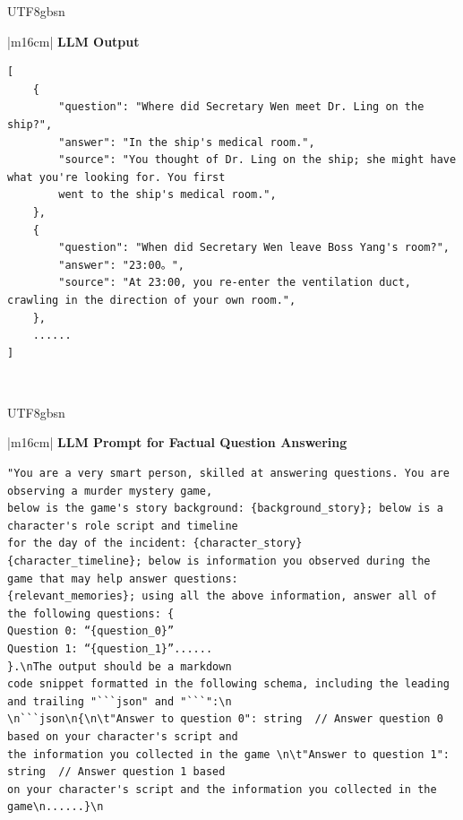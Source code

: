 \documentclass[11pt]{article}
\begin{document}
{\begin{CJK}{UTF8}{gbsn}
\begin{table}[ht!]
\begin{minipage}[t]{\linewidth}
\begin{tabular}{|m{16cm}|}
\hline
{}  \textbf{LLM Output}  \\
\hline
\begin{minipage}[t]{\linewidth}
\small\begin{verbatim}
[
    {
        "question": "Where did Secretary Wen meet Dr. Ling on the ship?",
        "answer": "In the ship's medical room.",
        "source": "You thought of Dr. Ling on the ship; she might have what you're looking for. You first 
        went to the ship's medical room.",
    },
    {
        "question": "When did Secretary Wen leave Boss Yang's room?",
        "answer": "23:00。",
        "source": "At 23:00, you re-enter the ventilation duct, crawling in the direction of your own room.",
    },
    ......
]
\end{verbatim}
\end{minipage} \\
\hline
\end{tabular}
\end{minipage}
\caption{LLM prompts and outputs for factual question generation. (English Translation)}
\end{table}
\end{CJK}






\begin{CJK}{UTF8}{gbsn}
\begin{table}[ht!]
\centering
\begin{minipage}[t]{\linewidth}
\begin{tabular}{|m{16cm}|}
  {\textbf{LLM Prompt for Factual Question Answering}} \\
\begin{minipage}[t]{\linewidth}
\small\begin{verbatim}
"You are a very smart person, skilled at answering questions. You are observing a murder mystery game, 
below is the game's story background: {background_story}; below is a character's role script and timeline 
for the day of the incident: {character_story}
{character_timeline}; below is information you observed during the game that may help answer questions:
{relevant_memories}; using all the above information, answer all of the following questions: {
Question 0: “{question_0}”
Question 1: “{question_1}”......
}.\nThe output should be a markdown
code snippet formatted in the following schema, including the leading and trailing "```json" and "```":\n
\n```json\n{\n\t"Answer to question 0": string  // Answer question 0 based on your character's script and
the information you collected in the game \n\t"Answer to question 1": string  // Answer question 1 based 
on your character's script and the information you collected in the game\n......}\n


\end{verbatim}
\end{minipage}
\end{tabular}
\end{minipage}
\end{table}
\end{CJK}}
\end{document}
